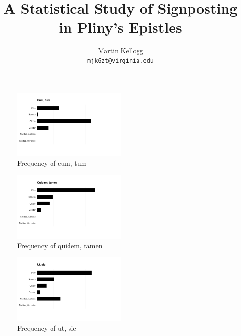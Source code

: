 \documentclass[11pt,twocolumn]{article}
\begin{document}
\title{A Statistical Study of Signposting in Pliny's Epistles}

\author{
  Martin Kellogg\\
  \texttt{mjk6zt@virginia.edu}
}

\maketitle






\twocolumn

\appendix

\begin{figure}
\includegraphics[width=0.5\textwidth]{cumtum.png}
\caption{\label{fig:gs}\label{fig:ct}Frequency of cum, tum}
\end{figure}

\begin{figure}
\includegraphics[width=0.5\textwidth]{quidemtamen.png}
\caption{\label{fig:qt}Frequency of quidem, tamen}
\end{figure}

\begin{figure}
\includegraphics[width=0.5\textwidth]{utsic.png}
\caption{\label{fig:us}Frequency of ut, sic}
\end{figure}
\end{document}

